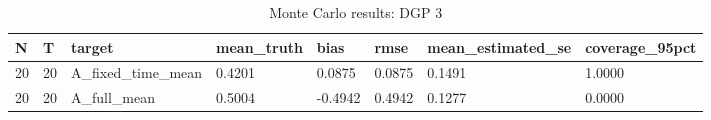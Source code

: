 \begin{table}[!htbp]
\centering
\caption{Monte Carlo results: DGP 3}
\label{tab:mc-dgp3}
\begin{tabular}{llllllll}
\toprule
N & T & target & mean\_truth & bias & rmse & mean\_estimated\_se & coverage\_95pct \\
\midrule
20 & 20 & A\_fixed\_time\_mean & 0.4201 & 0.0875 & 0.0875 & 0.1491 & 1.0000 \\
20 & 20 & A\_full\_mean & 0.5004 & -0.4942 & 0.4942 & 0.1277 & 0.0000 \\
\bottomrule
\end{tabular}
\end{table}
